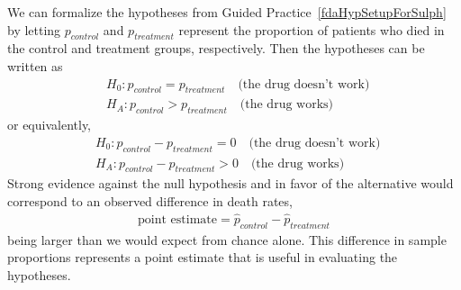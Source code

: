 We can formalize the hypotheses from Guided Practice~\ref{fdaHypSetupForSulph} by letting $p_{control}$ and $p_{treatment}$ represent the proportion of patients who died in the control and treatment groups, respectively. Then the hypotheses can be written as
\begin{eqnarray*}
&&H_0: p_{control} = p_{treatment} \quad\text{(the drug doesn't work)} \quad \\
&&H_A: p_{control} > p_{treatment} \quad\text{(the drug works)}
\end{eqnarray*}
or equivalently,
\begin{eqnarray*}
&&H_0: p_{control} - p_{treatment} = 0 \quad\text{(the drug doesn't work)} \quad \\
&&H_A: p_{control} - p_{treatment} > 0 \quad\text{(the drug works)}
\end{eqnarray*}
Strong evidence against the null hypothesis and in favor of the alternative would correspond to an observed difference in death rates,
\begin{eqnarray*}
\text{point estimate} = \hat{p}_{control} - \hat{p}_{treatment}
\end{eqnarray*}
being larger than we would expect from chance alone. This difference in sample proportions represents a point estimate that is useful in evaluating the hypotheses. 


